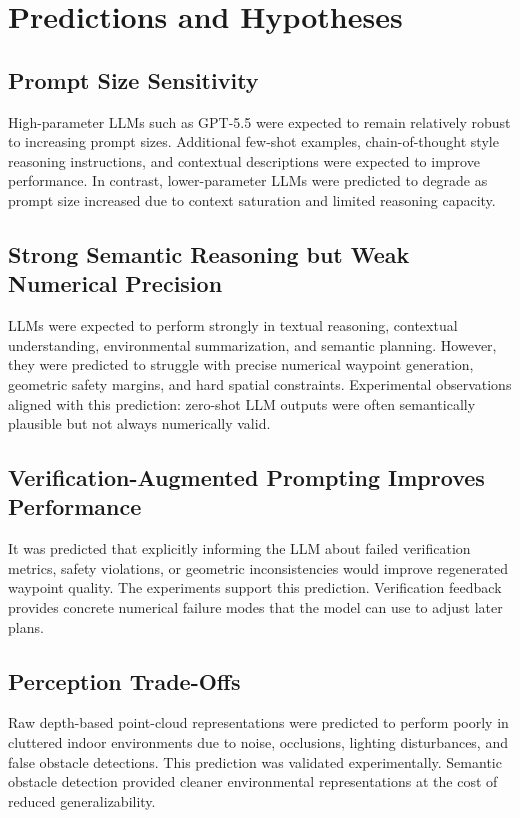 \documentclass[11pt]{article}
\begin{document}
\section{Predictions and Hypotheses}

\subsection{Prompt Size Sensitivity}

High-parameter LLMs such as GPT-5.5 were expected to remain relatively robust to increasing prompt sizes. Additional few-shot examples, chain-of-thought style reasoning instructions, and contextual descriptions were expected to improve performance. In contrast, lower-parameter LLMs were predicted to degrade as prompt size increased due to context saturation and limited reasoning capacity.

\subsection{Strong Semantic Reasoning but Weak Numerical Precision}

LLMs were expected to perform strongly in textual reasoning, contextual understanding, environmental summarization, and semantic planning. However, they were predicted to struggle with precise numerical waypoint generation, geometric safety margins, and hard spatial constraints. Experimental observations aligned with this prediction: zero-shot LLM outputs were often semantically plausible but not always numerically valid.

\subsection{Verification-Augmented Prompting Improves Performance}

It was predicted that explicitly informing the LLM about failed verification metrics, safety violations, or geometric inconsistencies would improve regenerated waypoint quality. The experiments support this prediction. Verification feedback provides concrete numerical failure modes that the model can use to adjust later plans.

\subsection{Perception Trade-Offs}

Raw depth-based point-cloud representations were predicted to perform poorly in cluttered indoor environments due to noise, occlusions, lighting disturbances, and false obstacle detections. This prediction was validated experimentally. Semantic obstacle detection provided cleaner environmental representations at the cost of reduced generalizability.
\end{document}
